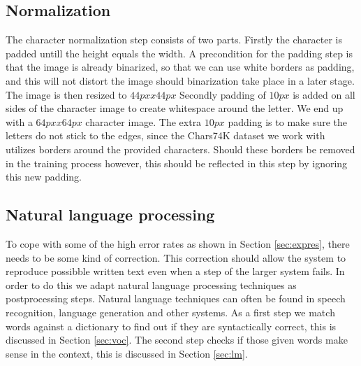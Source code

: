 \documentclass{article}
\begin{document}
\subsection{Normalization}
The character normalization step consists of two parts.
Firstly the character is padded untill the height equals the width.
A precondition for the padding step is that the image is already binarized, so that we can use white borders as padding, and this will not distort the image should binarization take place in a later stage.
The image is then resized to $44px x 44px$
Secondly padding of $10px$ is added on all sides of the character image to create whitespace around the letter.
We end up with a $64px x 64px$ character image.
The extra $10px$ padding is to make sure the letters do not stick to the edges, since the Chars74K dataset we work with utilizes borders around the provided characters. Should these borders be removed in the training process however, this should be reflected in this step by ignoring this new padding.

\subsection{Natural language processing}
To cope with some of the high error rates as shown in Section \ref{sec:expres}, there needs to be some kind of correction. This correction should allow the system to reproduce possibble written text even when a step of the larger system fails. 
In order to do this we adapt natural language processing techniques as postprocessing steps. Natural language techniques can often be found in speech recognition, language generation and other systems. 
As a first step we match words against a dictionary to find out if they are syntactically correct, this is discussed in Section \ref{sec:voc}. The second step checks if those given words make sense in the context, this is discussed in Section \ref{sec:lm}.
\end{document}
